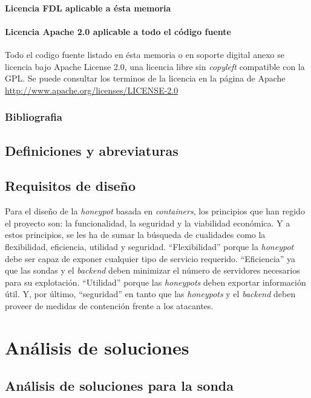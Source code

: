 \subsubsection{Licencia FDL aplicable a ésta memoria}

\subsubsection{Licencia Apache 2.0 aplicable a todo el código fuente}
Todo el codigo fuente listado en ésta memoria o en soporte digital anexo se licencia bajo Apache License 2.0, una licencia libre sin \emph{copyleft} compatible con la GPL.
Se puede consultar los terminos de la licencia en la página de Apache \url{http://www.apache.org/licenses/LICENSE-2.0}

\subsection{Bibliografia}
\printbibliography[title={Referencias},heading=none]
\nopagebreak
\section{Definiciones y abreviaturas}
\section{Requisitos de diseño}

Para el diseño de la \emph{honeypot} basada en \emph{containers}, los principios que han regido el proyecto son: la funcionalidad, la seguridad y la viabilidad económica. Y a estos principios, se les ha de sumar la búsqueda de cualidades como la flexibilidad, eficiencia, utilidad y seguridad. ``Flexibilidad'' porque la \emph{honeypot} debe ser capaz de exponer cualquier tipo de servicio requerido. ``Eficiencia'' ya que las sondas y el \emph{backend} deben minimizar el número de servidores necesarios para su explotación. ``Utilidad'' porque las \emph{honeypots} deben exportar información útil. Y, por último, ``seguridad''  en tanto que las \emph{honeypots} y el \emph{backend} deben proveer de medidas de contención frente a los atacantes.



\chapter{Análisis de soluciones}
\minitoc{}


\section{Análisis de soluciones para la sonda}
\label{sec:analisis-sonda}


